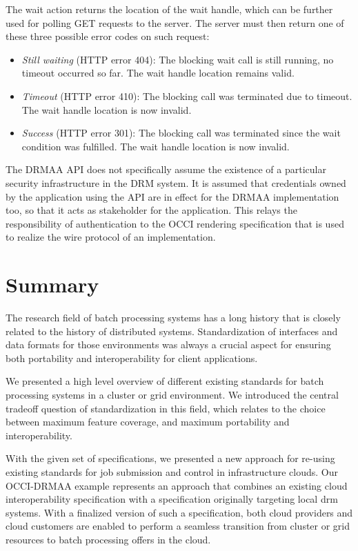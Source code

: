 \documentclass[twocolumn]{svjour3}       %
\begin{document}
The wait action returns the location of the wait handle, which can be further used for polling GET requests to the server. The server must then return one of these three possible error codes on such request:

\begin{itemize}
\item \emph{Still waiting} (HTTP error 404): The blocking wait call is still running, no timeout occurred so far. The wait handle location remains valid.
\item \emph{Timeout} (HTTP error 410): The blocking call was terminated due to timeout. The wait handle location is now invalid.
\item \emph{Success} (HTTP error 301): The blocking call was terminated since the wait condition was fulfilled. The wait handle location is now invalid.
\end{itemize}

The DRMAA API does not specifically assume the existence of a particular security infrastructure in the DRM system. It is assumed that credentials owned by the application using the API are in effect for the DRMAA implementation too, so that it acts as stakeholder for the application. This relays the responsibility of authentication to the OCCI rendering specification that is used to realize the wire protocol of an implementation. 

\section{Summary}

The research field of batch processing systems has a long history that is closely related to the history of distributed systems. Standardization of interfaces and data formats for those environments was always a crucial aspect for ensuring both portability and interoperability for client applications.

We presented a high level overview of different existing standards for batch processing systems in a cluster or grid environment. We introduced the central tradeoff question of standardization in this field, which relates to the choice between maximum feature coverage, and maximum portability and interoperability. 

With the given set of specifications, we presented a new approach for re-using existing standards for job submission and control in infrastructure clouds. Our OCCI-DRMAA example represents an approach that combines an existing cloud interoperability specification with a specification originally targeting local \gls{drm} systems. With a finalized version of such a specification, both cloud providers and cloud customers are enabled to perform a seamless transition from cluster or grid resources to batch processing offers in the cloud. 

\printglossaries


\end{document}
